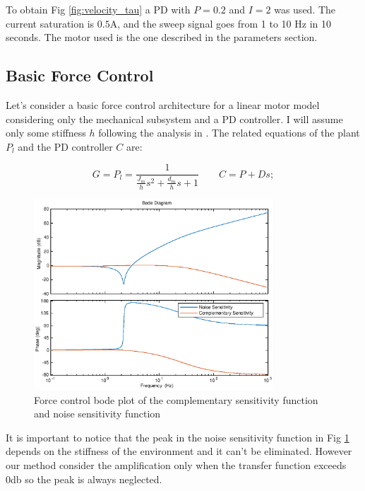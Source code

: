 \documentclass[a4paper,11pt]{article}
\begin{document}
  To obtain Fig \ref{fig:velocity_tau} a PD with $P = 0.2$ and $I = 2$ was used. The current saturation is $0.5$A, and the sweep signal goes from 1 to 10 Hz in 10 seconds. The motor used is the one described in the parameters section.

\newpage
\subsection{Basic Force Control}
Let's consider a basic force control architecture for a linear motor model considering only the mechanical subsystem and a PD controller. I will assume only some stiffness $h$ following the analysis in \cite{eppinger}. The related equations of the plant $P_l$ and the PD controller $C$ are:

\[
G = P_{l} = \frac{1}{\frac{J_m}{h}s^2 + \frac{d_m}{h}s + 1} \qquad
C = P + Ds;                             
\]

\bigskip
\begin{figure}[H]
\begin{center}
\includegraphics[width=0.8\textwidth]{images/force_tf.eps}
\end{center}
\caption{Force control bode plot of the complementary sensitivity function and noise sensitivity function}
\label{fig:force_tf}
\end{figure}

\bigskip 
It is important to notice that the peak in the noise sensitivity function in Fig \ref{fig:force_tf} depends on the stiffness of the environment and it can't be eliminated. However our method consider the amplification only when the transfer function exceeds 0db so the peak is always neglected.

\newpage
\end{document}
